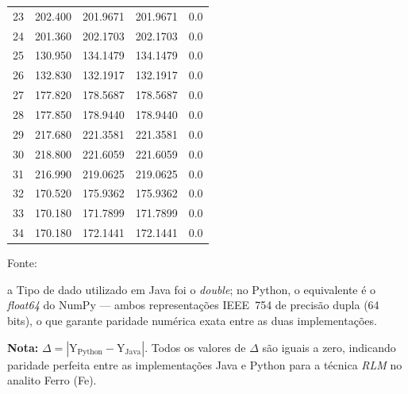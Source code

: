\begin{table}[H]
\begin{threeparttable}
{\begin{tabular}{
    S[table-format=2.0]
    S[table-format=3.3]
    S[table-format=3.4]
    S[table-format=3.4]
    S[table-format=1.1]
}
23  & 202.400  & 201.9671  & 201.9671  & 0.0 \\
24  & 201.360  & 202.1703  & 202.1703  & 0.0 \\
25  & 130.950  & 134.1479  & 134.1479  & 0.0 \\
26  & 132.830  & 132.1917  & 132.1917  & 0.0 \\
27  & 177.820  & 178.5687  & 178.5687  & 0.0 \\
28  & 177.850  & 178.9440  & 178.9440  & 0.0 \\
29  & 217.680  & 221.3581  & 221.3581  & 0.0 \\
30  & 218.800  & 221.6059  & 221.6059  & 0.0 \\
31  & 216.990  & 219.0625  & 219.0625  & 0.0 \\
32  & 170.520  & 175.9362  & 175.9362  & 0.0 \\
33  & 170.180  & 171.7899  & 171.7899  & 0.0 \\
34  & 170.180  & 172.1441  & 172.1441  & 0.0 \\
\bottomrule
\end{tabular}%
}
\begin{center}
\begin{minipage}{0.85\linewidth}
\begin{tablenotes}
\footnotesize
\item Fonte:~\oautor
\item[a] Tipo de dado utilizado em Java foi o \textit{double}; no Python,
o equivalente é o \textit{float64} do NumPy — ambos representações IEEE~754
de precisão dupla (64 bits), o que garante paridade numérica exata entre as
duas implementações.
\item \textbf{Nota:} $\Delta = |\text{Y}_{\text{Python}} - \text{Y}_{\text{Java}}|$.
Todos os valores de $\Delta$ são iguais a zero, indicando paridade
perfeita entre as implementações Java e Python para a técnica \textit{RLM}
no analito Ferro (Fe).
\end{tablenotes}
\end{minipage}
\end{center}
\end{threeparttable}
\end{table}

